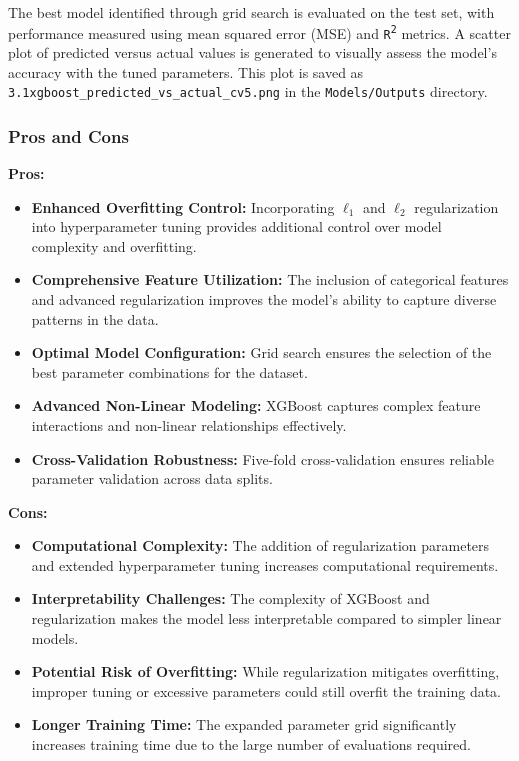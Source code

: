 The best model identified through grid search is evaluated on the test set, with performance measured using mean squared error (MSE) and \texttt{R\textsuperscript{2}} metrics. A scatter plot of predicted versus actual values is generated to visually assess the model’s accuracy with the tuned parameters. This plot is saved as \texttt{3.1xgboost\_predicted\_vs\_actual\_cv5.png} in the \texttt{Models/Outputs} directory.

\subsubsection*{Pros and Cons}

\textbf{Pros:}
\begin{itemize}
    \item \textbf{Enhanced Overfitting Control:} Incorporating \(\ell_1\) and \(\ell_2\) regularization into hyperparameter tuning provides additional control over model complexity and overfitting.
    \item \textbf{Comprehensive Feature Utilization:} The inclusion of categorical features and advanced regularization improves the model's ability to capture diverse patterns in the data.
    \item \textbf{Optimal Model Configuration:} Grid search ensures the selection of the best parameter combinations for the dataset.
    \item \textbf{Advanced Non-Linear Modeling:} XGBoost captures complex feature interactions and non-linear relationships effectively.
    \item \textbf{Cross-Validation Robustness:} Five-fold cross-validation ensures reliable parameter validation across data splits.
\end{itemize}

\textbf{Cons:}
\begin{itemize}
    \item \textbf{Computational Complexity:} The addition of regularization parameters and extended hyperparameter tuning increases computational requirements.
    \item \textbf{Interpretability Challenges:} The complexity of XGBoost and regularization makes the model less interpretable compared to simpler linear models.
    \item \textbf{Potential Risk of Overfitting:} While regularization mitigates overfitting, improper tuning or excessive parameters could still overfit the training data.
    \item \textbf{Longer Training Time:} The expanded parameter grid significantly increases training time due to the large number of evaluations required.
\end{itemize}

